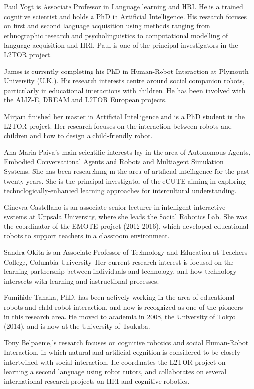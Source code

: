 \documentclass{sig-alternate-05-2015}
\begin{document}
Paul Vogt is Associate Professor in Language learning and HRI. He is a trained cognitive scientist and holds a PhD in Artificial Intelligence. His research focuses on first and second language acquisition using methods ranging from ethnographic research and psycholinguistics to computational modelling of language acquisition and HRI. Paul is one of the principal investigators in the L2TOR project.

 James is currently completing his PhD in Human-Robot Interaction at Plymouth University (U.K.). His research interests centre around social companion robots, particularly in educational interactions with children. He has been involved with the ALIZ-E, DREAM and L2TOR European projects.

 Mirjam finished her master in Artificial Intelligence and is a PhD student in the L2TOR project. Her research focuses on the interaction between robots and children and how to design a child-friendly robot.

 Ana Maria Paiva’s main scientific interests lay in the area of Autonomous Agents, Embodied Conversational Agents and Robots and Multiagent Simulation Systems. She has been researching in the area of artificial intelligence for the past twenty years. She is the principal investigator of the eCUTE aiming in exploring technologically-enhanced learning approaches for intercultural understanding.

 Ginevra Castellano is an associate senior lecturer in intelligent interactive systems at Uppsala University, where she leads the Social Robotics Lab. She was the coordinator of the EMOTE project (2012-2016), which developed educational robots to support teachers in a classroom environment.

 Sandra Okita is an Associate Professor of Technology and Education at Teachers College, Columbia University. Her current research interest is focused on the learning partnership between individuals and technology, and how technology intersects with learning and instructional processes.

 Fumihide Tanaka, PhD,  has been actively working in the area of educational robots and child-robot interaction, and now is recognized as one of the pioneers in this research area. He moved to academia in 2008, the University of Tokyo (2014), and is now at the University of Tsukuba.

 Tony Belpaeme,’s research focuses on cognitive robotics and social Human-Robot Interaction, in which natural and artificial cognition is considered to be closely intertwined with social interaction. He coordinates the L2TOR project on learning a second language using robot tutors, and collaborates on several international research projects on HRI and cognitive robotics.
\end{document}
